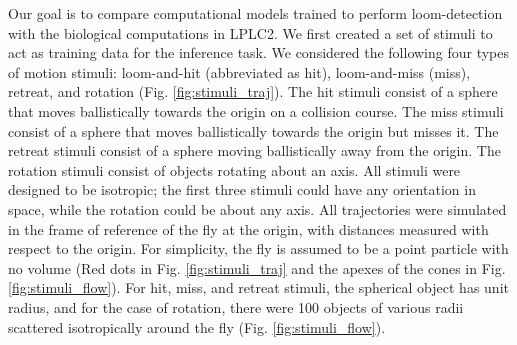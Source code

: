 \documentclass[pdftex,9pt,lineno]{elife}
\begin{document}
Our goal is to compare computational models trained to perform loom-detection with the biological computations in LPLC2. We first created a set of stimuli to act as training data for the inference task. We considered the following four types of motion stimuli: loom-and-hit (abbreviated as hit), loom-and-miss (miss), retreat, and rotation (Fig. \ref{fig:stimuli_traj}). The hit stimuli consist of a sphere that moves ballistically towards the origin on a collision course. The miss stimuli consist of a sphere that moves ballistically towards the origin but misses it. The retreat stimuli consist of a sphere moving ballistically away from the origin. The rotation stimuli consist of objects rotating about an axis. All stimuli were designed to be isotropic; the first three stimuli could have any orientation in space, while the rotation could be about any axis. All trajectories were simulated in the frame of reference of the fly at the origin, with distances measured with respect to the origin. For simplicity, the fly is assumed to be a point particle with no volume (Red dots in Fig. \ref{fig:stimuli_traj} and the apexes of the cones in Fig. \ref{fig:stimuli_flow}). For hit, miss, and retreat stimuli, the spherical object has unit radius, and for the case of rotation, there were 100 objects of various radii scattered isotropically around the fly (Fig. \ref{fig:stimuli_flow}).
\end{document}
